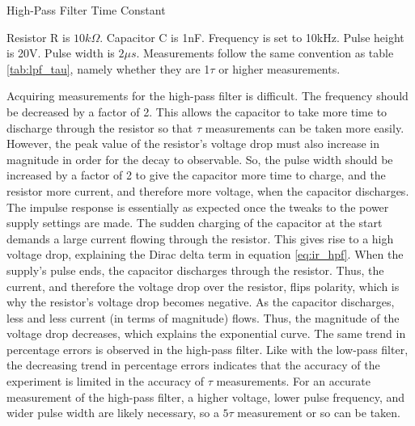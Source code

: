 \FloatBarrier

\begin{table}[h!]
\centering
\caption{High-Pass Filter Time Constant}
\label{tab:hpf_tau}
\end{table}
{\footnotesize Resistor R is $10k\Omega$. Capacitor C is 1nF. Frequency is set to 10kHz. Pulse height is 20V. Pulse width is $2\mu s$. Measurements follow the same convention as table \ref{tab:lpf_tau}, namely whether they are 1$\tau$ or higher measurements.} \\
\FloatBarrier

Acquiring measurements for the high-pass filter is difficult. The frequency should be decreased by a factor of 2. This allows the capacitor to take more time to discharge through the resistor so that $\tau$ measurements can be taken more easily. However, the peak value of the resistor's voltage drop must also increase in magnitude in order for the decay to observable. So, the pulse width should be increased by a factor of 2 to give the capacitor more time to charge, and the resistor more current, and therefore more voltage, when the capacitor discharges.
The impulse response is essentially as expected once the tweaks to the power supply settings are made. The sudden charging of the capacitor at the start demands a large current flowing through the resistor. This gives rise to a high voltage drop, explaining the Dirac delta term in equation \ref{eq:ir_hpf}.
When the supply's pulse ends, the capacitor discharges through the resistor. Thus, the current, and therefore the voltage drop over the resistor, flips polarity, which is why the resistor's voltage drop becomes negative. As the capacitor discharges, less and less current (in terms of magnitude) flows. Thus, the magnitude of the voltage drop decreases, which explains the exponential curve.
The same trend in percentage errors is observed in the high-pass filter. Like with the low-pass filter, the decreasing trend in percentage errors indicates that the accuracy of the experiment is limited in the accuracy of $\tau$ measurements. For an accurate measurement of the high-pass filter, a higher voltage, lower pulse frequency, and wider pulse width are likely necessary, so a $5\tau$ measurement or so can be taken.
